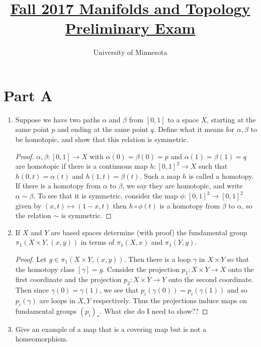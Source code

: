 \documentclass{article}
\title{\href{https://math.umn.edu/sites/math.umn.edu/files/exams/mantopf17.pdf}{Fall 2017 Manifolds and Topology Preliminary Exam}}
\author{University of Minnesota}
\date{}
\begin{document}
\maketitle

\section*{Part A}
\begin{enumerate}
	\item Suppose we have two paths $\alpha$ and $\beta$ from $[0,1]$ to a space $X$, starting at the same point $p$ and ending at the same point $q$. Define what it means for $\alpha, \beta$ to be homotopic, and show that this relation is symmetric.
	
	\begin{proof}
	$\alpha,\beta : [0,1] \rightarrow X$ with $\alpha(0) = \beta(0) =p$ and 
	$\alpha(1) = \beta(1) = q$ are homotopic if there is a continuous map 
	$h:[0,1]^2 \rightarrow X$ such that $h(0,t) = \alpha(t)$ and $h(1,t) = \beta(t)$.
	Such a map $h$ is called a homotopy. 
	If there is a homotopy from $\alpha$ to $\beta$, 
	we say they are homotopic, and write $\alpha \sim \beta$.
	To see that it is symmetric, consider the map $\phi: [0,1]^2 \rightarrow [0,1]^2$ 
	given by $(x,t) \mapsto (1-x,t)$ then $h \circ \phi(t)$ is a 
	homotopy from $\beta$ to $\alpha$, so the relation $\sim$ is symmetric.
	\end{proof}
	
	\item If $X$ and $Y$ are based spaces determine (with proof) the fundamental group 
	$\pi_1(X \times Y, (x,y))$ in terms of $\pi_1(X, x)$ and $\pi_1(Y,y)$.
	
	\begin{proof}
	Let $g \in \pi_1(X\times Y, (x,y))$. Then there is a loop
	$\gamma$ in $X \times Y$ so that the homotopy class $[\gamma]=g$.
	Consider the projection $p_1: X\times Y \rightarrow X$ onto the first coordinate
	and the projection $p_2: X \times Y \rightarrow Y$  onto the second coordinate.
	Then since $\gamma(0) = \gamma(1)$, we see that 
	$p_i(\gamma(0)) = p_i(\gamma(1))$ and so $p_i(\gamma)$ 
	are loops in $X,Y$ respectively. 
	Thus the projections induce maps on fundamental groups $(p_i)_*$.
	{\color{red} What else do I need to show??}
	\end{proof}
	
	\item Give an example of a map that is a covering map but is not a homeomorphism.
	

\end{enumerate}
\end{document}
